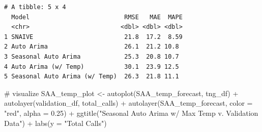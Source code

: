 \documentclass[
  letterpaper,
  DIV=11,
  numbers=noendperiod]{scrartcl}
\newenvironment{Shaded}{\begin{snugshade}}{\end{snugshade}}
\newcommand{\AttributeTok}[1]{\textcolor[rgb]{0.40,0.45,0.13}{#1}}
\newcommand{\CommentTok}[1]{\textcolor[rgb]{0.37,0.37,0.37}{#1}}
\newcommand{\FloatTok}[1]{\textcolor[rgb]{0.68,0.00,0.00}{#1}}
\newcommand{\FunctionTok}[1]{\textcolor[rgb]{0.28,0.35,0.67}{#1}}
\newcommand{\NormalTok}[1]{\textcolor[rgb]{0.00,0.23,0.31}{#1}}
\newcommand{\OtherTok}[1]{\textcolor[rgb]{0.00,0.23,0.31}{#1}}
\newcommand{\SpecialCharTok}[1]{\textcolor[rgb]{0.37,0.37,0.37}{#1}}
\newcommand{\StringTok}[1]{\textcolor[rgb]{0.13,0.47,0.30}{#1}}
\begin{document}
\begin{Shaded}
\end{Shaded}

\begin{verbatim}
# A tibble: 5 x 4
  Model                          RMSE   MAE  MAPE
  <chr>                         <dbl> <dbl> <dbl>
1 SNAIVE                         21.8  17.2  8.59
2 Auto Arima                     26.1  21.2 10.8 
3 Seasonal Auto Arima            25.3  20.8 10.7 
4 Auto Arima (w/ Temp)           30.1  23.9 12.5 
5 Seasonal Auto Arima (w/ Temp)  26.3  21.8 11.1 
\end{verbatim}

\begin{Shaded}
\begin{Highlighting}[]
\CommentTok{\# visualize}
\NormalTok{SAA\_temp\_plot }\OtherTok{\textless{}{-}} \FunctionTok{autoplot}\NormalTok{(SAA\_temp\_forecast, tng\_df) }\SpecialCharTok{+} 
  \FunctionTok{autolayer}\NormalTok{(validation\_df, total\_calls) }\SpecialCharTok{+} 
  \FunctionTok{autolayer}\NormalTok{(SAA\_temp\_forecast, }\AttributeTok{color =} \StringTok{"red"}\NormalTok{, }\AttributeTok{alpha =} \FloatTok{0.25}\NormalTok{) }\SpecialCharTok{+}
  \FunctionTok{ggtitle}\NormalTok{(}\StringTok{"Seasonal Auto Arima w/ Max Temp v. Validation Data"}\NormalTok{) }\SpecialCharTok{+} 
  \FunctionTok{labs}\NormalTok{(}\AttributeTok{y =} \StringTok{"Total Calls"}\NormalTok{)}
\end{Highlighting}
\end{Shaded}
\end{document}

